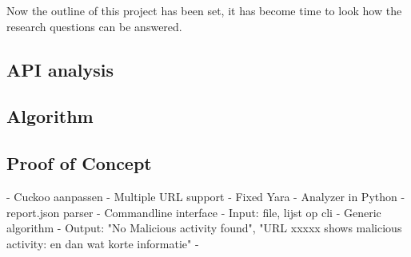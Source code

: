 

Now the outline of this project has been set, it has become time to look how the research questions can be answered. 

\subsection{API analysis}

\subsection{Algorithm}


\subsection{Proof of Concept}
	- Cuckoo aanpassen
		- Multiple URL support
		- Fixed Yara
	- Analyzer in Python
		- report.json parser
		- Commandline interface
			- Input: file, lijst op cli
			- Generic algorithm
			- Output: "No Malicious activity found", "URL xxxxx shows malicious activity: en dan wat korte informatie" 
		- 
